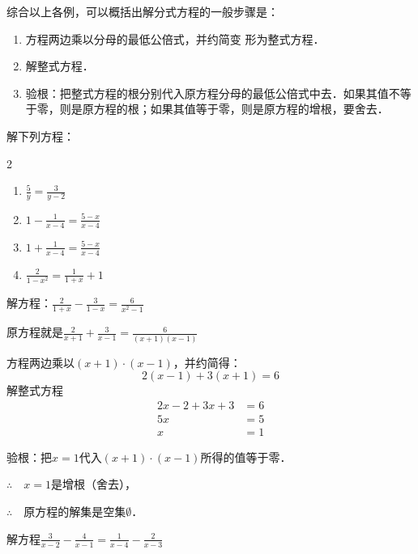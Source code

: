 综合以上各例，可以概括出解分式方程的一般步骤是：
\begin{enumerate}
    \item 方程两边乘以分母的最低公倍式，并约简变
形为整式方程．
\item 解整式方程．
\item 验根：把整式方程的根分别代入原方程分母的最低公倍式中去．如果其值不等于零，则是原方程的根；如果其值等于零，则是原方程的增根，要舍去．
\end{enumerate}

\begin{ex}
   解下列方程：
   \begin{multicols}{2}
       \begin{enumerate}
        \item $\frac{5}{y}=\frac{3}{y-2}$
        \item $1-\frac{1}{x-4}=\frac{5-x}{x-4}$
        \item $1+\frac{1}{x-4}=\frac{5-x}{x-4}$
        \item $\frac{2}{1-x^2}=\frac{1}{1+x}+1$
    \end{enumerate}
   \end{multicols}
   
\end{ex}

\begin{example}
    解方程：$\frac{2}{1+x}-\frac{3}{1-x}=\frac{6}{x^2-1}$
\end{example}

\begin{solution}
原方程就是$\frac{2}{x+1}+\frac{3}{x-1}=\frac{6}{(x+1)(x-1)}$

方程两边乘以$(x+1)\cdot (x-1)$，并约简得：
\[2(x-1)+3(x+1)=6\]
解整式方程
\[\begin{split}
    2x-2+3x+3&=6\\
    5x&=5\\
    x&=1
\end{split}\]
 
验根：把$x=1$代入$(x+1)\cdot (x-1)$所得的值等于零．

$\therefore\quad x=1$是增根（舍去），

$\therefore\quad$原方程的解集是空集$\emptyset$．
\end{solution}



\begin{example}
解方程$\frac{3}{x-2}-\frac{4}{x-1}=\frac{1}{x-4}-\frac{2}{x-3}$
\end{example}

